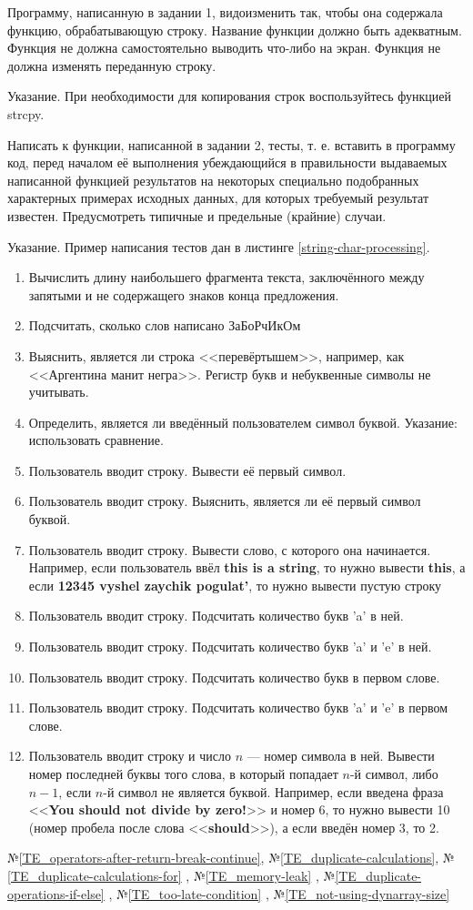 \labtask

Программу, написанную в задании 1, видоизменить так, чтобы она содержала функцию, обрабатывающую строку.
Название функции должно быть адекватным.
Функция не должна самостоятельно выводить что-либо на экран.
Функция не должна изменять переданную строку.

Указание. При необходимости для копирования строк воспользуйтесь функцией strcpy.

\labtask

Написать к функции, написанной в задании 2, тесты,
т. е. вставить в программу код, перед началом её выполнения убеждающийся в правильности выдаваемых написанной функцией результатов
на некоторых специально подобранных характерных примерах исходных данных,
для которых требуемый результат известен.
Предусмотреть типичные и предельные (крайние) случаи.

Указание. Пример написания тестов дан в листинге \ref{string-char-processing}.

\reservedtasks

\begin{enumerate}
	\item
		Вычислить длину наибольшего фрагмента текста, заключённого между запятыми и не содержащего знаков конца предложения.
	\item
		Подсчитать, сколько слов написано ЗаБоРчИкОм
	\item
		Выяснить, является ли строка <<перевёртышем>>, например, как <<Аргентина манит негра>>.
		Регистр букв и небуквенные символы не учитывать.
	\item
		Определить, является ли введённый пользователем символ буквой.
		Указание: использовать сравнение.
	\item
		Пользователь вводит строку.
		Вывести её первый символ.
	\item
		Пользователь вводит строку.
		Выяснить, является ли её первый символ буквой.
	\item
		Пользователь вводит строку.
		Вывести слово, с которого она начинается.
		Например, если пользователь ввёл
		\textbf{this is a string},
		то нужно вывести
		\textbf{this},
		а если
		\textbf{12345 vyshel zaychik pogulat'},
		то нужно вывести пустую строку
	\item
		Пользователь вводит строку.
		Подсчитать количество букв 'a' в ней.
	\item
		Пользователь вводит строку.
		Подсчитать количество букв 'a' и 'e' в ней.
	\item
		Пользователь вводит строку.
		Подсчитать количество букв в первом слове.
	\item
		Пользователь вводит строку.
		Подсчитать количество букв 'a' и 'e' в первом слове.
	\item
		Пользователь вводит строку и число $n$ --- номер символа в ней.
		Вывести номер последней буквы того слова, в который попадает $n$-й символ,
		либо $n-1$, если $n$-й символ не является буквой.
		Например, если введена фраза <<\textbf{You should not divide by zero!}>>
		и номер 6, то нужно вывести 10 (номер пробела после слова <<\textbf{should}>>),
		а если введён номер 3, то 2.
\end{enumerate}

\typerrors
№\ref{TE_operators-after-return-break-continue},
№\ref{TE_duplicate-calculations},
№\ref{TE_duplicate-calculations-for}%
, №\ref{TE_memory-leak}%
, №\ref{TE_duplicate-operations-if-else}%
, №\ref{TE_too-late-condition}%
, №\ref{TE_not-using-dynarray-size}%

